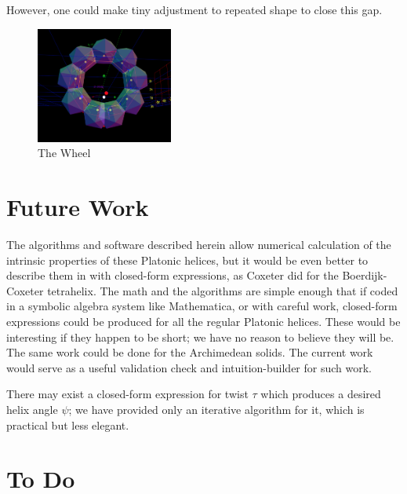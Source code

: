 \documentclass[11pt]{article}
\begin{document}
{\begin{itemize}
  However, one could make tiny adjustment to repeated shape to close this gap.
\begin{figure}
     \centering
     \includegraphics[width=0.40\textwidth]{figures/TheWheel.png}
     \caption{The Wheel}
  \label{fig:thewheel}
\end{figure}
\end{itemize}

\section{Future Work}

The algorithms and software described herein allow numerical calculation of the intrinsic properties of these
Platonic helices, but it would be even better to describe them in with closed-form expressions,
as Coxeter did for the Boerdijk-Coxeter tetrahelix.
The math and the algorithms are simple enough that if coded in a symbolic algebra system like Mathematica,
or with careful work, closed-form
expressions could be produced for all the regular Platonic helices.
These would be interesting if they happen to be short; we have no reason to
believe they will be. The same work could be done for the Archimedean solids. The current work would
serve as a useful validation check and intuition-builder for such work.

There may exist a closed-form expression for twist $\tau$ which produces a desired helix angle $\psi$; we have provided only
an iterative algorithm for it, which is practical but less elegant.

\section{ To Do}

}
\end{document}

